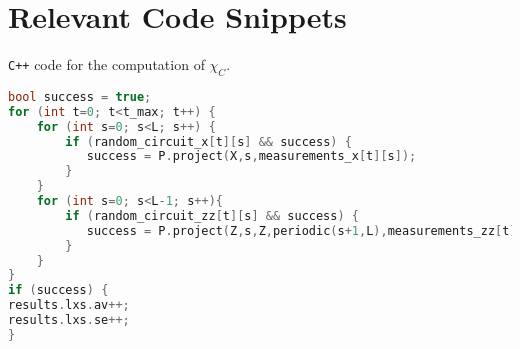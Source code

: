 \chapter{Relevant Code Snippets}
\label{ch:apdx-code}

\lstset{style=myStyle}

\verb|C++| code for the computation of $\chi_C$.
\begin{lstlisting}[caption=Computation of the linear cross entropy for one
  measurement history of a circuit, label={lst:lxe-cpp}, language=C++]
bool success = true; 
for (int t=0; t<t_max; t++) {
    for (int s=0; s<L; s++) {
        if (random_circuit_x[t][s] && success) {
           success = P.project(X,s,measurements_x[t][s]);
        }
    }
    for (int s=0; s<L-1; s++){
        if (random_circuit_zz[t][s] && success) {
           success = P.project(Z,s,Z,periodic(s+1,L),measurements_zz[t][s]);
        }
    }
}
if (success) {
results.lxs.av++;
results.lxs.se++;
}
\end{lstlisting}

